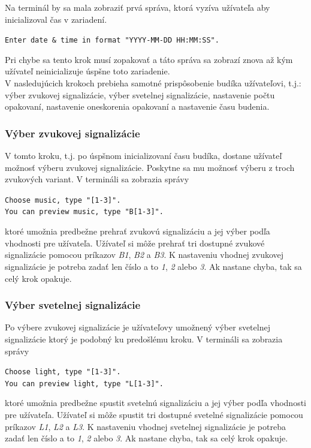 \documentclass[11pt,a4paper]{article}
\begin{document}
        \indent Na terminál by sa mala zobraziť prvá správa, ktorá vyzíva užívateľa aby inicializoval čas v zariadení. 
        \begin{center}
            \texttt{Enter date \& time in format "YYYY-MM-DD HH:MM:SS".}
        \end{center}
        Pri chybe sa tento krok musí zopakovať a táto správa sa zobrazí znova až kým užívateľ neinicializuje úspšne toto zariadenie.\\

        \indent V nasledujúcich krokoch prebieha samotné prispôsobenie budíka užívateľovi, t.j.: výber zvukovej signalizácie, výber svetelnej signalizácie, nastavenie počtu opakovaní, nastavenie oneskorenia opakovaní a nastavenie času budenia.

        \subsubsection{Výber zvukovej signalizácie}

            \indent V tomto kroku, t.j. po úspšnom inicializovaní času budíka, dostane užívateľ možnosť výberu zvukovej signalizácie. Poskytne sa mu možnosť výberu z troch zvukových variant. V termináli sa zobrazia správy
            \begin{center}
                \texttt{Choose music, type "[1-3]".}\\
                \texttt{You can preview music, type "B[1-3]".}
            \end{center}
            ktoré umožnia predbežne prehrať zvukovú signalizáciu a jej výber podľa vhodnosti pre užívateľa. Užívateľ si môže prehrať tri dostupné zvukové signalizácie pomocou príkazov \textit{B1}, \textit{B2} a \textit{B3}. K nastaveniu vhodnej zvukovej signalizácie je potreba zadať len číslo a to \textit{1}, \textit{2} alebo \textit{3}. Ak nastane chyba, tak sa celý krok opakuje.

        \subsubsection{Výber svetelnej signalizácie}

            \indent Po výbere zvukovej signalizácie je užívateľovy umožnený výber svetelnej signalizácie ktorý je podobný ku predošlému kroku. V termináli sa zobrazia správy
            \begin{center}
                \texttt{Choose light, type "[1-3]".}\\
                \texttt{You can preview light, type "L[1-3]".}
            \end{center}
            ktoré umožnia predbežne spustit svetelnú signalizáciu a jej výber podľa vhodnosti pre užívateľa. Užívateľ si môže spustit tri dostupné svetelné signalizácie pomocou príkazov \textit{L1}, \textit{L2} a \textit{L3}. K nastaveniu vhodnej svetelnej signalizácie je potreba zadať len číslo a to \textit{1}, \textit{2} alebo \textit{3}. Ak nastane chyba, tak sa celý krok opakuje.
\end{document}
